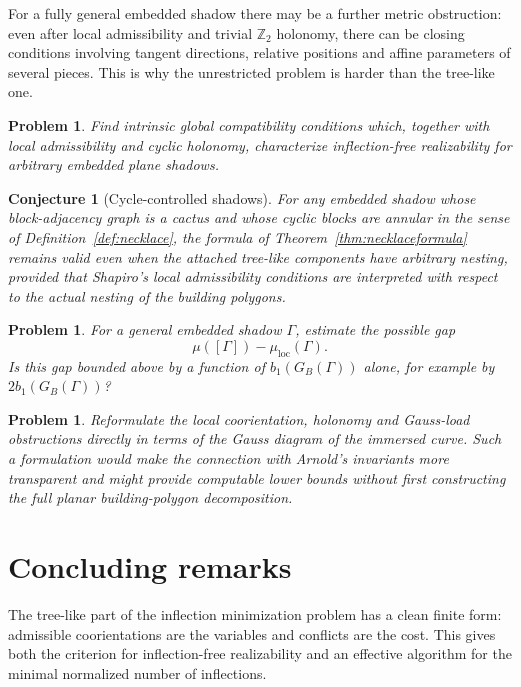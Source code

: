 \documentclass[11pt]{article}
\newtheorem{problem}[theorem]{Problem}
\newtheorem{conjecture}[theorem]{Conjecture}
\newcommand{\loc}{\mathrm{loc}}
\begin{document}
For a fully general embedded shadow there may be a further metric obstruction: even after local admissibility and trivial $\mathbb Z_2$ holonomy, there can be closing conditions involving tangent directions, relative positions and affine parameters of several pieces.  This is why the unrestricted problem is harder than the tree-like one.

\begin{problem}\label{prob:globalconditions}
Find intrinsic global compatibility conditions which, together with local admissibility and cyclic holonomy, characterize inflection-free realizability for arbitrary embedded plane shadows.
\end{problem}

\begin{conjecture}[Cycle-controlled shadows]\label{conj:cyclecontrolled}
For any embedded shadow whose block-adjacency graph is a cactus and whose cyclic blocks are annular in the sense of Definition~\ref{def:necklace}, the formula of Theorem~\ref{thm:necklaceformula} remains valid even when the attached tree-like components have arbitrary nesting, provided that Shapiro's local admissibility conditions are interpreted with respect to the actual nesting of the building polygons.
\end{conjecture}

\begin{problem}\label{prob:gap}
For a general embedded shadow $\Gamma$, estimate the possible gap
\[
 \mu([\Gamma])-\mu_{\loc}(\Gamma).
\]
Is this gap bounded above by a function of $b_1(G_B(\Gamma))$ alone, for example by $2b_1(G_B(\Gamma))$?
\end{problem}

\begin{problem}\label{prob:gauss}
Reformulate the local coorientation, holonomy and Gauss-load obstructions directly in terms of the Gauss diagram of the immersed curve.  Such a formulation would make the connection with Arnold's invariants more transparent and might provide computable lower bounds without first constructing the full planar building-polygon decomposition.
\end{problem}

\section{Concluding remarks}

The tree-like part of the inflection minimization problem has a clean finite form: admissible coorientations are the variables and conflicts are the cost.  This gives both the criterion for inflection-free realizability and an effective algorithm for the minimal normalized number of inflections.
\end{document}
